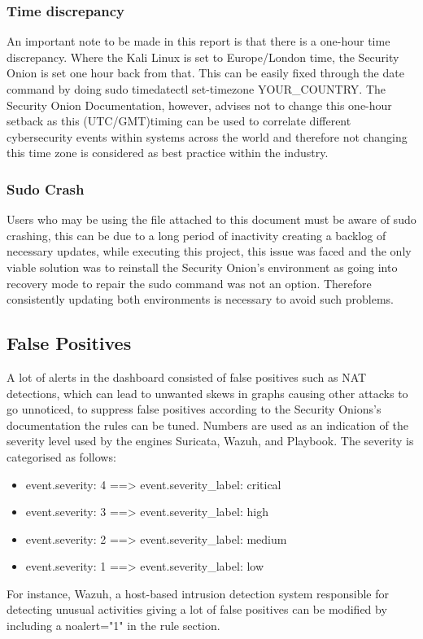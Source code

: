 \documentclass[12pt]{article}
\begin{document}
\subsubsection{Time discrepancy}
An important note to be made in this report is that there is a one-hour time discrepancy. Where the Kali Linux is set to Europe/London time, the Security Onion is set one hour back from that. This can be easily fixed through the date command by doing sudo timedatectl set-timezone YOUR\_COUNTRY. The Security Onion Documentation, however, advises not to change this one-hour setback as this (UTC/GMT)timing can be used to correlate different cybersecurity events within systems across the world and therefore not changing this time zone is considered as best practice within the industry.
\subsubsection{Sudo Crash}
Users who may be using the file attached to this document must be aware of sudo crashing, this can be due to a long period of inactivity creating a backlog of necessary updates, while executing this project, this issue was faced and the only viable solution was to reinstall the Security Onion's environment as going into recovery mode to repair the sudo command was not an option. Therefore consistently updating both environments is necessary to avoid such problems.

\subsection{False Positives}
A lot of alerts in the dashboard consisted of false positives such as NAT detections, which can lead to unwanted skews in graphs causing other attacks to go unnoticed, to suppress false positives according to the Security Onions's documentation the rules can be tuned. Numbers are used as an indication of the severity level used by the engines Suricata, Wazuh, and Playbook. The severity is categorised as follows:
\begin{itemize}
\item event.severity: 4 ==>  event.severity\_label: critical
\item 	event.severity: 3 ==> event.severity\_label: high
\item	event.severity: 2 ==> event.severity\_label: medium
\item	event.severity: 1 ==> event.severity\_label: low


\end{itemize} 
For instance, Wazuh, a host-based intrusion detection system responsible for detecting unusual activities giving a lot of false positives can be modified by including a noalert="1" in the rule section.
\end{document}
